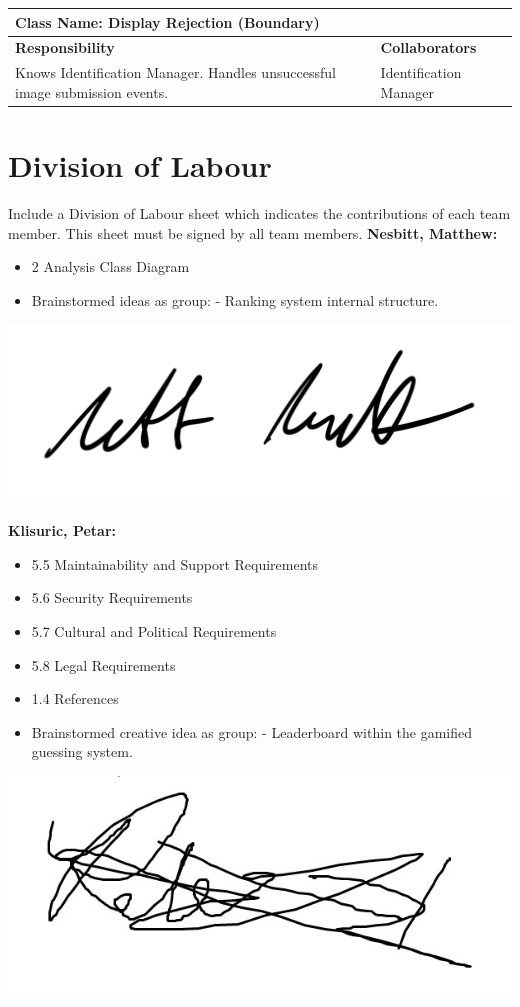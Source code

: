 \documentclass[]{article}
\begin{document}
	\begin{table}[H]
		\centering
		\begin{tabular}{|p{8cm}|p{8cm}|}
		\hline
		\multicolumn{2}{|l|}{\textbf{Class Name:} Display Rejection (Boundary)} \\
		\hline
		\textbf{Responsibility} & \textbf{Collaborators} \\
		\hline
		Knows Identification Manager. \newline Handles unsuccessful image submission events. & Identification Manager \\
		\hline
		\end{tabular}
	\end{table}

\appendix
\section{Division of Labour}
Include a Division of Labour sheet which indicates the contributions of each team member. This sheet must be signed by all team members.
\label{sec:division_of_labour}
\textbf{Nesbitt, Matthew:}
\begin{itemize}
	\item 2 Analysis Class Diagram
	\item Brainstormed ideas as group:
		\subitem - Ranking system internal structure.
\end{itemize}
\includegraphics[scale=0.15]{mattsignature.jpg}

\textbf{Klisuric, Petar:}
\begin{itemize}
	\item 5.5 Maintainability and Support Requirements
	\item 5.6 Security Requirements
	\item 5.7 Cultural and Political Requirements
	\item 5.8 Legal Requirements
	\item 1.4 References
    \item Brainstormed creative idea as group:
		\subitem - Leaderboard within the gamified guessing system.
\end{itemize}
\includegraphics[scale=0.15]{petarsignature.jpg}
\end{document}
